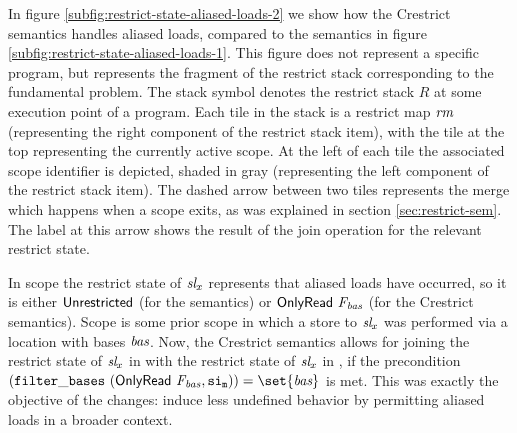 In figure \ref{subfig:restrict-state-aliased-loads-2} we show how the Crestrict semantics handles aliased loads, compared
to the \cink{} semantics in figure \ref{subfig:restrict-state-aliased-loads-1}.
This figure does not represent a specific program, but represents the fragment of the restrict stack corresponding to the fundamental problem.
The stack symbol denotes the restrict stack $R$ at some execution point of a program.
Each tile in the stack is a restrict map $\textit{rm}$ (representing the right component of the restrict stack item), with the tile at the top representing the
currently active scope.
At the left of each tile the associated scope identifier is depicted, shaded in gray (representing the left component of the restrict stack item).
The dashed arrow between two tiles represents the merge which happens when a scope exits, as was explained in section \ref{sec:restrict-sem}.
The label at this arrow shows the result of the join operation for the relevant restrict state.

In scope  the restrict state of $\textit{sl}_x$ represents that aliased loads have occurred,
so it is either $\mathsf{Unrestricted}$ (for the \cink{} semantics) or $\mathsf{OnlyRead} \ \textit{F}\textsubscript{\textit{bas}}$ (for the Crestrict semantics).
Scope  is some prior scope in which a store to $\textit{sl}_x$ was performed via a location with bases $\textit{bas}$.
Now, the Crestrict semantics allows for joining the restrict state of $\textit{sl}_x$ in  with the restrict state
of $\textit{sl}_x$ in ,
if the precondition $(\filterbases \ (\onlyread{\Basesfamvar}, \scope{m})) = \set{\Basesvar}$ is met.
This was exactly the objective of the changes: induce less undefined behavior by permitting aliased
loads in a broader context.


